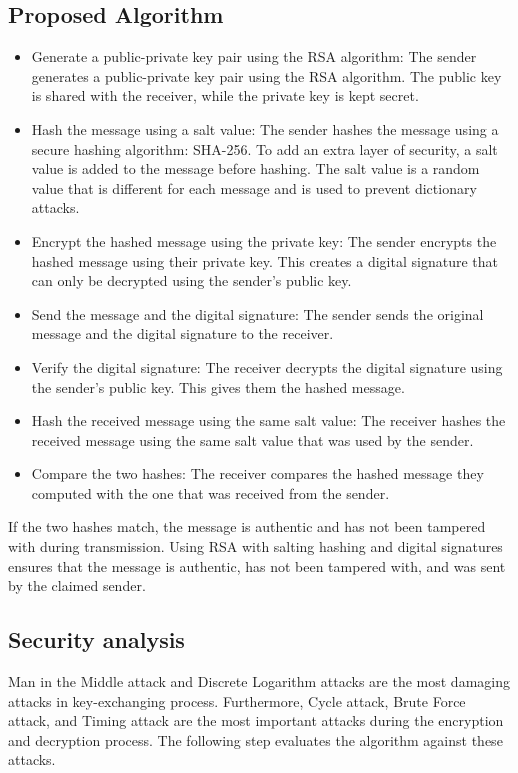 \subsection*{Proposed Algorithm}
\begin{itemize}	
	\item Generate a public-private key pair using the RSA algorithm: The sender generates a public-private key pair using the RSA algorithm. 
	The public key is shared with the receiver, while the private key is kept secret.
	\item Hash the message using a salt value: The sender hashes the message using a secure hashing algorithm: SHA-256. 
	To add an extra layer of security, a salt value is added to the message before hashing. 
	The salt value is a random value that is different for each message and is used to prevent dictionary attacks.
	\item Encrypt the hashed message using the private key: The sender encrypts the hashed message using their private key. 
	This creates a digital signature that can only be decrypted using the sender's public key.
	\item Send the message and the digital signature: The sender sends the original message and the digital signature to the receiver.
	\item Verify the digital signature: The receiver decrypts the digital signature using the sender's public key. This gives them the hashed message.
	\item Hash the received message using the same salt value: The receiver hashes the received message using the same salt value that was used by the sender.
	\item Compare the two hashes: The receiver compares the hashed message they computed with the one that was received from the sender. 
\end{itemize}
If the two hashes match, the message is authentic and has not been tampered with during transmission.
Using RSA with salting hashing and digital signatures ensures that the message is authentic, has not been tampered with, 
and was sent by the claimed sender.
\pagebreak
\subsection{Security analysis}
Man in the Middle attack and Discrete Logarithm attacks
are the most damaging attacks in key-exchanging process.
Furthermore, Cycle attack, Brute Force attack, and Timing
attack are the most important attacks during the encryption
and decryption process. The following step evaluates the
algorithm against these attacks.
